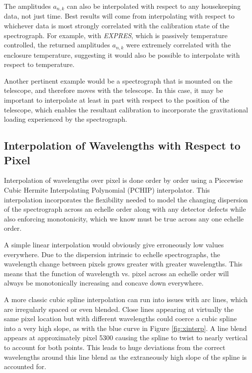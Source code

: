 \documentclass[modern]{aastex63}
\newcommand{\project}[1]{\textsl{#1}}
\newcommand{\acronym}[1]{{\small{#1}}}
\newcommand{\expres}{\project{\acronym{EXPRES}}}
\begin{document}
The amplitudes $a_{n,k}$ can also be interpolated with respect to any housekeeping data, not just time.  Best results will come from interpolating with respect to whichever data is most strongly correlated with the calibration state of the spectrograph.  For example, with \expres, which is passively temperature controlled, the returned amplitudes $a_{n,k}$ were extremely correlated with the enclosure temperature, suggesting it would also be possible to interpolate with respect to temperature.

Another pertinent example would be a spectrograph that is mounted on the telescope, and therefore moves with the telescope.  In this case, it may be important to interpolate at least in part with respect to the position of the telescope, which enables the resultant calibration to incorporate the gravitational loading experienced by the spectrograph.


\subsection{Interpolation of Wavelengths with Respect to Pixel}
\label{sec:choice_wvp}
Interpolation of wavelengths over pixel  is done order by order using a Piecewise Cubic Hermite Interpolating Polynomial (PCHIP) interpolator.  This interpolation incorporates the flexibility needed to model the changing dispersion of the spectrograph across an echelle order along with any detector defects while also enforcing monotonicity, which we know must be true across any one echelle order.

A simple linear interpolation would obviously give erroneously low values everywhere.  Due to the dispersion intrinsic to echelle spectrographs, the wavelength change between pixels grows greater with greater wavelengths.  This means that the function of wavelength vs. pixel across an echelle order will always be monotonically increasing and concave down everywhere.

A more classic cubic spline interpolation can run into issues with arc lines, which are irregularly spaced or even blended.  Close lines appearing at virtually the same pixel location but with different wavelengths could coerce a cubic spline into a very high slope, as with the blue curve in Figure \ref{fig:xinterp}.  A line blend appears at approximately pixel 5300 causing the spline to twist to nearly vertical to account for both points.  This leads to huge deviations from the correct wavelengths around this line blend as the extraneously high slope of the spline is accounted for.
\end{document}
